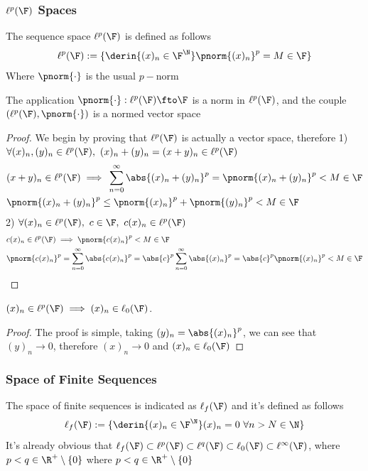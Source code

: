 \documentclass[../mmf.tex]{subfiles}
\begin{document}
\subsubsection{$\ell^p(\F)$ Spaces}
\begin{dfn}
	The sequence space $\ell^p(\F)$ is defined as follows
	\begin{equation}
		\ell^p(\F):=\{\derin{(x)_n\in\F^{\N}}\pnorm{(x)_n}^p=M\in\F\}
		\label{eq:ellpspace}
	\end{equation}
	Where $\pnorm{\cdot}$ is the usual $p-$norm
\end{dfn}
\begin{prop}
	The application $\pnorm{\cdot}:\ell^p(\F)\fto\F$ is a norm in $\ell^p(\F)$, and the couple $(\ell^p(\F),\pnorm{\cdot})$ is a normed vector space
\end{prop}
\begin{proof}
	We begin by proving that $\ell^p(\F)$ is actually a vector space, therefore
	1) $\forall(x)_n,(y)_n\in\ell^p(\F),\ (x)_n+(y)_n=(x+y)_n\in\ell^p(\F)$
	\begin{equation*}
		\begin{aligned}
			&(x+y)_n\in\ell^p(\F)\implies{}\sum_{n=0}^\infty\abs{(x)_n+(y)_n}^p=\pnorm{(x)_n+(y)_n}^p<M\in\F\\
			&\pnorm{(x)_n+(y)_n}^p\le\pnorm{(x)_n}^p+\pnorm{(y)_n}^p<M\in\F
		\end{aligned}
	\end{equation*}
	2) $\forall(x)_n\in\ell^p(\F),\ c\in\F,\ c(x)_n\in\ell^p(\F)$
	\begin{equation*}
		\begin{aligned}
			&c(x)_n\in\ell^p(\F)\implies{}\pnorm{c(x)_n}^p<M\in\F\\
			&\pnorm{c(x)_n}^p=\sum_{n=0}^\infty\abs{c(x)_n}^p=\abs{c}^p\sum_{n=0}^\infty\abs{(x)_n}^p=\abs{c}^p\pnorm{(x)_n}^p<M\in\F
		\end{aligned}
	\end{equation*}
\end{proof}
\begin{rmk}
	$(x)_n\in\ell^p(\F)\implies{}(x)_n\in\ell_0(\F)$.
\end{rmk}
\begin{proof}
	The proof is simple, taking $(y)_n=\abs{(x)_n}^p$, we can see that $(y)_n\to0$, therefore $(x)_n\to0$ and $(x)_n\in\ell_0(\F)$
\end{proof}
\subsubsection{Space of Finite Sequences}
\begin{dfn}
	The space of finite sequences is indicated as $\ell_f(\F)$ and it's defined as follows
	\begin{equation}
		\ell_f(\F):=\{\derin{(x)_n\in\F^{\N}}(x)_n=0\ \forall n>N\in\N\}
		\label{eq:ellf}
	\end{equation}
	It's already obvious that $\ell_f(\F)\subset\ell^p(\F)\subset\ell^q(\F)\subset\ell_0(\F)\subset\ell^\infty(\F)$, where $p<q\in\R^+\setminus\{0\}$ where $p<q\in\R^+\setminus\{0\}$
\end{dfn}
\end{document}
